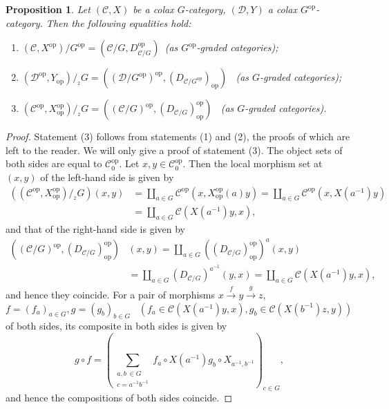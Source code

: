 \documentclass{surv-l}
\numberwithin{equation}{chapter}
\numberwithin{figure}{chapter}
\theoremstyle{plain}
\newtheorem{prp}[thm]{Proposition}
\theoremstyle{definition}
\theoremstyle{remark}
\newcommand{\sndorbit}{/\!_{_{2}}}
\begin{document}
\begin{prp}\label{prp:rel-orbit-sndorbit}
Let $({\mathcal{C}}, X)$ be a colax $G$-category, $({\mathcal{D}}, Y)$ a colax $G^{\mathrm{op}}$-category.
Then the following equalities hold:

\begin{enumerate}
\item
$({\mathcal{C}}, X^{\mathrm{op}})/G^{\mathrm{op}} = ({\mathcal{C}}/G, D_{{\mathcal{C}}/G}^{\mathrm{op}})$\
{\rm(}as $G^{\mathrm{op}}$-graded categories{\rm )};
\item
$({\mathcal{D}}^{\mathrm{op}}, Y_\mathrm{op})\sndorbit G = (({\mathcal{D}}/G^{\mathrm{op}})^{\mathrm{op}}, (D_{{\mathcal{C}}/G^{\mathrm{op}}})_\mathrm{op})$
\
{\rm(}as $G$-graded categories{\rm )};
\item
$({\mathcal{C}}^{\mathrm{op}}, X_\mathrm{op}^{\mathrm{op}})\sndorbit G = (({\mathcal{C}}/G)^{\mathrm{op}}, (D_{{\mathcal{C}}/G})^{\mathrm{op}}_\mathrm{op})$
\
{\rm(}as $G$-graded categories{\rm )}.
\end{enumerate}
\end{prp}

\begin{proof}
Statement (3) follows from statements (1) and (2), the proofs of which are left to the reader.
We will only give a proof of statement (3).
The object sets of both sides are equal to ${\mathcal{C}}^{\mathrm{op}}_0$.
Let $x, y \in {\mathcal{C}}^{\mathrm{op}}_0$.
Then the local morphism set at $(x, y)$ of the left-hand side is given by
\[
\begin{aligned}
(({\mathcal{C}}^{\mathrm{op}}, X_\mathrm{op}^{\mathrm{op}})\sndorbit G)(x, y) &= \coprod_{a\in G}{\mathcal{C}}^{\mathrm{op}}(x, X_\mathrm{op}^{\mathrm{op}}(a)y)
= \coprod_{a\in G}{\mathcal{C}}^{\mathrm{op}}(x, X(a^{-1})y)\\
&= \coprod_{a\in G}{\mathcal{C}}(X(a^{-1})y, x),
\end{aligned}
\]
and that of the right-hand side is given by
\[
\begin{aligned}
(({\mathcal{C}}/G)^{\mathrm{op}}, (D_{{\mathcal{C}}/G})^{\mathrm{op}}_\mathrm{op})&(x, y) = \coprod_{a\in G} ((D_{{\mathcal{C}}/G})^{\mathrm{op}}_\mathrm{op})^a(x,y)\\
&= \coprod_{a\in G}(D_{{\mathcal{C}}/G})^{a^{-1}}(y, x)
= \coprod_{a\in G}{\mathcal{C}}(X(a^{-1})y, x),
\end{aligned}
\]
and hence they coincide.
For a pair of morphisms $x \xrightarrow{f} y \xrightarrow{g} z$,\ $f = (f_a)_{a\in G}, g = (g_b)_{b \in G}$
\ $(f_a \in {\mathcal{C}}(X(a^{-1})y, x), g_b \in {\mathcal{C}}(X(b^{-1})z, y))$ of both sides,
its composite in both sides is given by
\[
g \circ f = \left(\sum_{\begin{smallmatrix} a,b\,\in G\\c=a^{-1} b^{-1} \end{smallmatrix}}f_a \circ X(a^{-1})g_b \circ X_{a^{-1}, b^{-1}} \right)_{c \in G},
\]
and hence the compositions of both sides coincide.
\end{proof}
\end{document}
